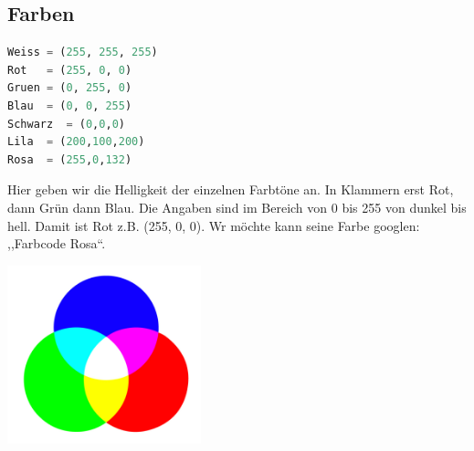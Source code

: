 \subsection{\large{Farben}}
\begin{lstlisting}[language=Python, caption=Farben]
Weiss = (255, 255, 255)
Rot   = (255, 0, 0)
Gruen = (0, 255, 0)
Blau  = (0, 0, 255)
Schwarz  = (0,0,0)
Lila  = (200,100,200)
Rosa  = (255,0,132)
\end{lstlisting}
Hier geben wir die Helligkeit der einzelnen Farbtöne an. In Klammern erst Rot, dann Grün dann Blau. Die Angaben sind im Bereich von 0 bis 255 von dunkel bis hell. Damit ist Rot z.B. (255, 0, 0). Wr möchte kann seine Farbe googlen: ,,Farbcode Rosa``.\\
\begin{minipage}[t]{\textwidth}
  \centering
  \includegraphics[width=0.42\textwidth]{pictures/RGB.png}
  \label{img:RGB}
\end{minipage}

